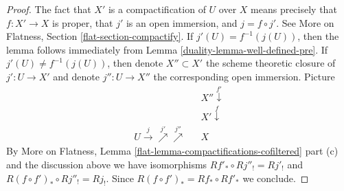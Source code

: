 \begin{proof}

The fact that $X'$ is a compactification of $U$ over $X$ means
precisely that $f : X' \to X$ is proper, that $j'$ is an open immersion,
and $j = f \circ j'$. See
More on Flatness, Section \ref{flat-section-compactify}.
If $j'(U) = f^{-1}(j(U))$, then the lemma follows immediately from
Lemma \ref{duality-lemma-well-defined-pre}.
If $j'(U) \not = f^{-1}(j(U))$, then denote $X'' \subset X'$ the
scheme theoretic closure of $j' : U \to X'$ and denote
$j'' : U \to X''$ the corresponding open immersion.
Picture
$$
\begin{array}{ccc} &  & X'' \overset{f'}{\downarrow} \\  &  & X' \overset{f}{\downarrow} \\ U \overset{j}{\longrightarrow}\overset{j'}{\nearrow}\overset{j''}{\nearrow} &  & X\end{array}
$$
By
More on Flatness, Lemma \ref{flat-lemma-compactifications-cofiltered} part (c)
and the discussion above we have isomorphisms
$Rf'_* \circ Rj''_! = Rj'_!$ and $R(f \circ f')_* \circ Rj''_! = Rj_!$.
Since $R(f \circ f')_* = Rf_* \circ Rf'_*$ we conclude.
\end{proof}

